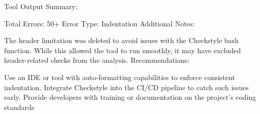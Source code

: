 \documentclass[twocolumn,10pt]{article}
\begin{document}
Tool Output Summary:

Total Errors: 50+
Error Type: Indentation
Additional Notes:

The header limitation was deleted to avoid issues with the Checkstyle bash function. While this allowed the tool to run smoothly, it may have excluded header-related checks from the analysis.
Recommendations:

Use an IDE or tool with auto-formatting capabilities to enforce consistent indentation.
Integrate Checkstyle into the CI/CD pipeline to catch such issues early.
Provide developers with training or documentation on the project's coding standards
\end{document}
